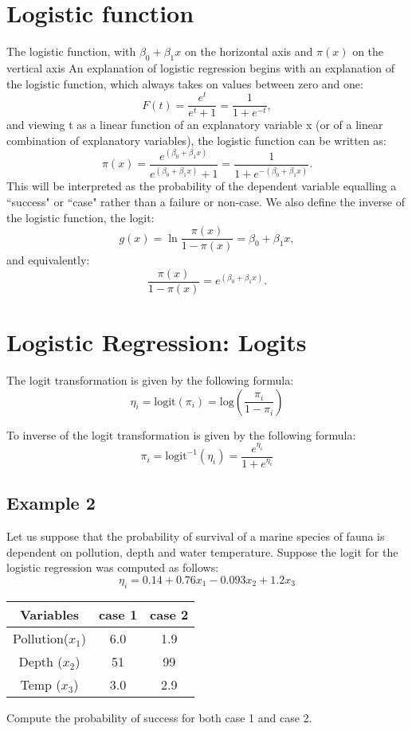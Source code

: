 \documentclass[12pt, a4paper]{article}
\theoremstyle{plain}
\theoremstyle{definition}
\theoremstyle{remark}
\begin{document}
\section*{Logistic function} 

The logistic function, with $\beta_0 + \beta_1 x$ on the horizontal axis and $\pi(x)$ on the vertical axis
An explanation of logistic regression begins with an explanation of the logistic function, which always takes on values between zero and one:
\[
F(t) = \frac{e^t}{e^t+1} = \frac{1}{1+e^{-t}},
\]
and viewing t as a linear function of an explanatory variable x (or of a linear combination of explanatory variables), the logistic function can be written as:
\[\pi(x) = \frac{e^{(\beta_0 + \beta_1 x)}} {e^{(\beta_0 + \beta_1 x)} + 1} = \frac {1} {1+e^{-(\beta_0 + \beta_1 x)}}.
\]
This will be interpreted as the probability of the dependent variable equalling a ``success" or ``case" rather than a failure or non-case. We also define the inverse of the logistic function, the logit:
\[g(x) = \ln \frac {\pi(x)} {1 - \pi(x)} = \beta_0 + \beta_1 x ,
\]and equivalently:
\[\frac{\pi(x)} {1 - \pi(x)} = e^{(\beta_0 + \beta_1 x)}.
\]

\section{Logistic Regression: Logits}

The logit transformation is given by the following formula: 
\[ \eta_i = \mbox{logit}(\pi_i)  = \mbox{log}\left( \frac{\pi_i}{1- \pi_i} \right) \]

To inverse of the logit transformation is given by the following formula: 
\[ \pi_i = \mbox{logit}^{-1}(\eta_i)  =  \frac{e^{\eta_i}}{1 + e^{\eta_i}} \]


\subsection{Example 2}
Let us suppose that the probability of survival of a marine species of fauna is dependent on pollution, depth and water temperature. Suppose the logit for the logistic regression was computed as follows:
\[ \eta_i = 0.14 + 0.76x_1 - 0.093x_2 + 1.2x_3  \]
\begin{center}
	\begin{tabular}{|c|c|c|}
		\hline
		Variables & case 1 & case 2 \\ \hline
		Pollution($x_1$) & 6.0 & 1.9 \\
		Depth ($x_2$)& 51 & 99 \\
		Temp ($x_3$) & 3.0 & 2.9 \\
		\hline
	\end{tabular}
\end{center}
Compute the probability of success for both case 1 and case 2.
\end{document}
